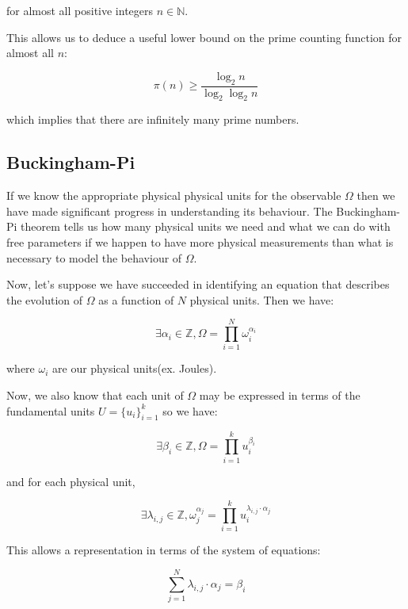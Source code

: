 \documentclass{article}
\begin{document}
for almost all positive integers $n \in \mathbb{N}$.

This allows us to deduce a useful lower bound on the prime counting function for almost all $n$:

\begin{equation}
\pi(n) \geq \frac{\log_2 n}{\log_2 \log_2 n}
\end{equation}

which implies that there are infinitely many prime numbers.

\subsection{Buckingham-Pi}

If we know the appropriate physical physical units for the observable $\Omega$ then we have made significant
progress in understanding its behaviour. The Buckingham-Pi theorem tells us how many physical units we need
and what we can do with free parameters if we happen to have more physical measurements than what is necessary
to model the behaviour of $\Omega$.

Now, let's suppose we have succeeded in identifying an equation that describes the evolution of $\Omega$ as a function
of $N$ physical units. Then we have:

\begin{equation}
\exists \alpha_i \in \mathbb{Z}, \Omega = \prod_{i=1}^N \omega_i^{\alpha_i} \tag{1}
\end{equation}

where $\omega_i$ are our physical units(ex. Joules).

Now, we also know that each unit of $\Omega$ may be expressed in terms of the fundamental units $U = \{u_i\}_{i=1}^k$
so we have:

\begin{equation}
\exists \beta_i \in \mathbb{Z}, \Omega = \prod_{i=1}^k u_i^{\beta_i} \tag{2}
\end{equation}

and for each physical unit,

\begin{equation}
\exists \lambda_{i,j} \in \mathbb{Z}, \omega_j^{\alpha_j} = \prod_{i=1}^k u_i^{\lambda_{i,j} \cdot \alpha_j} \tag{3}
\end{equation}

This allows a representation in terms of the system of equations:

\begin{equation}
\sum_{j=1}^N \lambda_{i,j} \cdot \alpha_j = \beta_i \tag{4} 
\end{equation}
\end{document}
